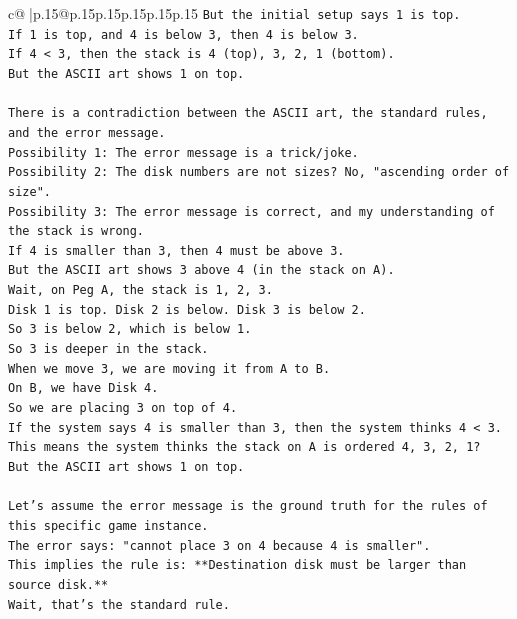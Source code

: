 \documentclass{article}
\begin{document}
{\begin{supertabular}{c@{$\;$}|p{.15\linewidth}@{}p{.15\linewidth}p{.15\linewidth}p{.15\linewidth}p{.15\linewidth}p{.15\linewidth}}
{{{\texttt{But the initial setup says 1 is top.} \\
\texttt{If 1 is top, and 4 is below 3, then 4 is below 3.} \\
\texttt{If 4 < 3, then the stack is 4 (top), 3, 2, 1 (bottom).} \\
\texttt{But the ASCII art shows 1 on top.} \\
\\ 
\texttt{There is a contradiction between the ASCII art, the standard rules, and the error message.} \\
\texttt{Possibility 1: The error message is a trick/joke.} \\
\texttt{Possibility 2: The disk numbers are not sizes? No, "ascending order of size".} \\
\texttt{Possibility 3: The error message is correct, and my understanding of the stack is wrong.} \\
\texttt{If 4 is smaller than 3, then 4 must be above 3.} \\
\texttt{But the ASCII art shows 3 above 4 (in the stack on A).} \\
\texttt{Wait, on Peg A, the stack is 1, 2, 3.} \\
\texttt{Disk 1 is top. Disk 2 is below. Disk 3 is below 2.} \\
\texttt{So 3 is below 2, which is below 1.} \\
\texttt{So 3 is deeper in the stack.} \\
\texttt{When we move 3, we are moving it from A to B.} \\
\texttt{On B, we have Disk 4.} \\
\texttt{So we are placing 3 on top of 4.} \\
\texttt{If the system says 4 is smaller than 3, then the system thinks 4 < 3.} \\
\texttt{This means the system thinks the stack on A is ordered 4, 3, 2, 1?} \\
\texttt{But the ASCII art shows 1 on top.} \\
\\ 
\texttt{Let's assume the error message is the ground truth for the rules of this specific game instance.} \\
\texttt{The error says: "cannot place 3 on 4 because 4 is smaller".} \\
\texttt{This implies the rule is: **Destination disk must be larger than source disk.**} \\
\texttt{Wait, that's the standard rule.} \\
}}}
\end{supertabular}}
\end{document}
